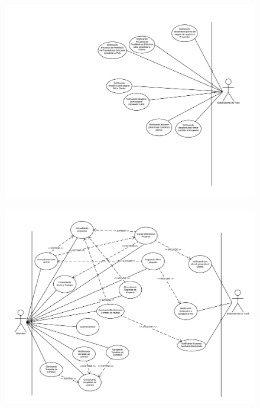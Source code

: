 \begin{figure}[H]
\centering
\includegraphics[width=\linewidth]{diag/viejos/cu3.pdf}
\end{figure}

\begin{figure}[H]
\centering
\includegraphics[width=\linewidth]{diag/viejos/cu4.pdf}
\end{figure}


